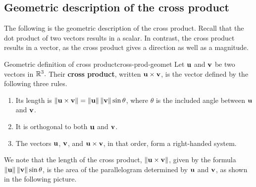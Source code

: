 \subsection{Geometric description of the cross product}

The following is the geometric description of the cross
product. Recall that the dot product of two vectors results in a
scalar. In contrast, the cross product results in a vector, as the
cross product gives a direction as well as
a magnitude.

\begin{definition}{Geometric definition of cross product}{cross-prod-geomet}
  Let\/ $\mbox{\bf u}$ and $\mbox{\bf v}$ be two vectors in $\mathbb{R}^{3}.$ Their
  \textbf{cross product}, written
  $\mbox{\bf u}\times \mbox{\bf v}$, is the vector defined by the following three rules.

\begin{enumerate}
\item Its length is $\left\|\mbox{\bf u}\times \mbox{\bf v}\right\| =\left\|\mbox{\bf u}\right\| \left\|
\mbox{\bf v}\right\| \sin \theta $, 
where $\theta $ is the included angle between $\mbox{\bf u}$ and $\mbox{\bf v}$.

\item It is orthogonal to both $\mbox{\bf u}$ and $\mbox{\bf v}$.

\item The vectors $\mbox{\bf u}$, $\mbox{\bf v}$, and $\mbox{\bf u}\times
  \mbox{\bf v}$, in that order, form a right-handed system.
\end{enumerate}
\end{definition}

We note that the length of the cross product,
$\left\|\mbox{\bf u}\times\mbox{\bf v}\right\|$, given by the formula
$\left\|\mbox{\bf u}\right\|\left\|\mbox{\bf v}\right\|\sin\theta$, is the area of the
parallelogram determined by $\mbox{\bf u}$ and $\mbox{\bf v}$, as shown in the
following picture.
\begin{center}
\end{center}

